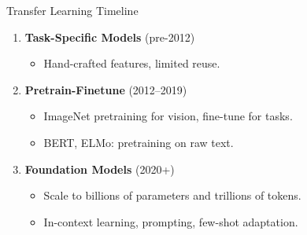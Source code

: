 \documentclass[aspectratio=169,10pt]{beamer}
\begin{document}

\begin{frame}{Transfer Learning Timeline}
  \begin{enumerate}
    \item[\textbf{Phase 1}] \textbf{Task-Specific Models} (pre-2012)
      \begin{itemize}
        \item Hand-crafted features, limited reuse.
      \end{itemize}

    \vspace{0.2cm}

    \item[\textbf{Phase 2}] \textbf{Pretrain-Finetune} (2012--2019)
      \begin{itemize}
        \item ImageNet pretraining for vision, fine-tune for tasks.
        \item BERT, ELMo: pretraining on raw text.
      \end{itemize}

    \vspace{0.2cm}

    \item[\textbf{Phase 3}] \textbf{Foundation Models} (2020+)
      \begin{itemize}
        \item Scale to billions of parameters and trillions of tokens.
        \item In-context learning, prompting, few-shot adaptation.
      \end{itemize}
  \end{enumerate}
\end{frame}
\end{document}
